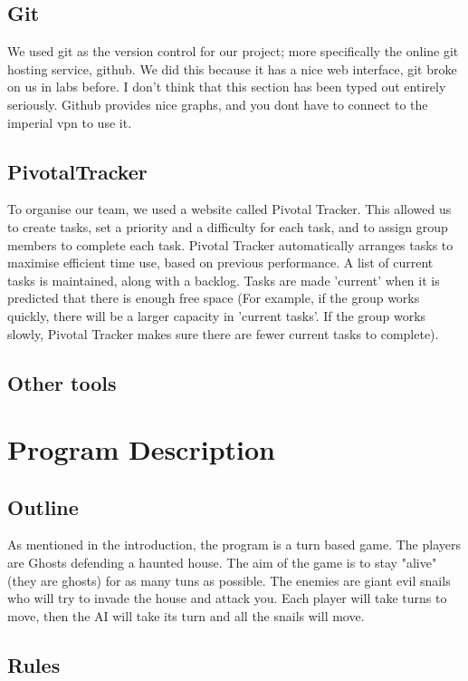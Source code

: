 \documentclass{article}
\begin{document}
\subsection{Git}
We used git as the version control for our project; more specifically the online git hosting service, github. We did this because it has a nice web interface, git broke on us in labs before. I don't think that this section has been typed out entirely seriously. Github provides nice graphs, and you dont have to connect to the imperial vpn to use it.
\subsection{PivotalTracker}
To organise our team, we used a website called Pivotal Tracker. This allowed us to create tasks, set a priority and a difficulty for each task, and to assign group members to complete each task. Pivotal Tracker automatically arranges tasks to maximise efficient time use, based on previous performance. A list of current tasks is maintained, along with a backlog. Tasks are made 'current' when it is predicted that there is enough free space (For example, if the group works quickly, there will be a larger capacity in 'current tasks'. If the group works slowly, Pivotal Tracker makes sure there are fewer current tasks to complete).
\subsection{Other tools}

\section{Program Description}
\subsection{Outline}
As mentioned in the introduction, the program is a turn based game. The players are Ghosts defending a haunted house. The aim of the game is to stay "alive" (they are ghosts) for as many tuns as possible. The enemies are giant evil snails who will try to invade the house and attack you. Each player will take turns to move, then the AI will take its turn and all the snails will move.
\subsection{Rules}
\end{document}

